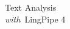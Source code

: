 \clearpage
\pagestyle{empty}
\cleardoublepage
\vspace*{1.75in}
\begin{center}
{\hfill \Huge Text Analysis \\[4pt] \hfill {\LARGE\it with}\ LingPipe 4}
\end{center}
